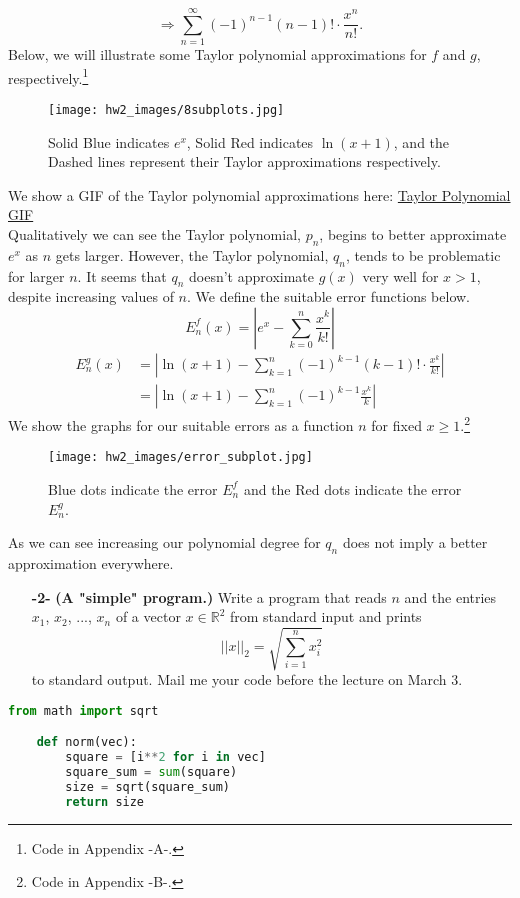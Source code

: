 \documentclass[11pt]{article}
\theoremstyle{definition}
\newcommand{\R}{\mathbb{R}}
\newcommand{\1}[1]{\mathbf{1} \left \{ #1 \right \}}
\begin{document}
\[\Longrightarrow \sum_{n=1}^{\infty} (-1)^{n-1} (n-1)! \cdot \frac{x^n}{n!}.\]
Below, we will illustrate some Taylor polynomial approximations for $f$ and $g$, respectively.\footnote{Code in Appendix -A-.}
\begin{figure}[H]
    \centering
    \texttt{[image: hw2\_images/8subplots.jpg]}
    \caption{Solid Blue indicates $e^x$, Solid Red indicates $\ln(x+1)$, and the Dashed lines represent their Taylor approximations respectively.}
    \label{fig:my_label}
\end{figure}
We show a GIF of the Taylor polynomial approximations here:
\href{https://github.com/3rundane/Numerical-Analysis-Project/blob/main/homework\%202\%20gifs/problemgif.gif}{Taylor Polynomial GIF} \\

Qualitatively we can see the Taylor polynomial, $p_n$, begins to better approximate $e^x$ as $n$ gets larger.  However, the Taylor polynomial, $q_n$, tends to be problematic for larger $n$.  It seems that $q_n$ doesn't approximate $g(x)$ very well for $x>1$, despite increasing values of $n$.  We define the suitable error functions below.
\[E_n^f (x) = \left|e^x - \sum_{k=0}^n \frac{x^k}{k!}\right|\]
\begin{equation*}
    \begin{split}
        E_n^g (x) &= \left|\ln (x+1) - \sum_{k=1}^n (-1)^{k-1} (k-1)! \cdot \frac{x^k}{k!}\right| \\
        &= \left|\ln (x+1) - \sum_{k=1}^n (-1)^{k-1} \frac{x^k}{k}\right|
    \end{split}
\end{equation*}
We show the graphs for our suitable errors as a function $n$ for fixed $x \geq 1$.\footnote{Code in Appendix -B-.}
\begin{figure}[H]
    \centering
    \texttt{[image: hw2\_images/error\_subplot.jpg]}
    \caption{Blue dots indicate the error $E_n^f$ and the Red dots indicate the error $E_n^g$.}
    \label{fig:my_label}
\end{figure}
As we can see increasing our polynomial degree for $q_n$ does not imply a better approximation everywhere.

\begin{itemize}
    \item[{\textbf{-2-}}] \textbf{(A "simple" program.)}  Write a program that reads $n$ and the entries $x_1$, $x_2$, ..., $x_n$ of a vector $x \in \R^2$ from standard input and prints
    \begin{equation*}
        ||x||_2 = \sqrt{\sum_{i=1}^n x_i^2}
    \end{equation*}
    to standard output.  Mail me your code before the lecture on March 3.
\end{itemize}
\begin{lstlisting}[language=Python]
    from math import sqrt

    def norm(vec):
        square = [i**2 for i in vec]
        square_sum = sum(square)
        size = sqrt(square_sum)
        return size
\end{lstlisting}
\end{document}
